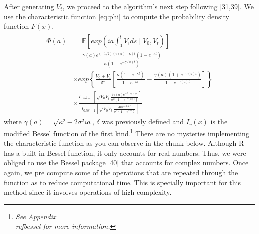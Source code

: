 \documentclass[12pt,oneside]{reedthesis}
\theoremstyle{definition}
\theoremstyle{definition}
\theoremstyle{remark}
\begin{document}
  After generating \(V_t\), we proceed to the algorithm's next step
  following {[}31,39{]}. We use the characteristic function \eqref{eq:phi}
  to compute the probability density function \(F(x)\).
  \begin{align} \label{eq:phi}
  \begin{split}
  \Phi(a) &= \mathbb{E}\left[ exp \left( ia \int_{0}^{t}{V_s ds} \mid V_0,V_t \right)  \right] \\[10pt]
  &= \frac{\gamma(a)e^{(-1/2)(\gamma(a)- \kappa) t} (1 - e^{- \kappa t})}{\kappa (1 - e^{- \gamma(a) t})} \\[10pt]
  &\times exp \left\{\frac{V_0 + V_t}{\sigma^2} \left[ \frac{\kappa (1 + e^{- \kappa t})}{1 - e^{- \kappa t}} - \frac{\gamma(a) (1 + e^{- \gamma(a) t})}{1 - e^{- \gamma(a) t}} \right] \right\} \\[10pt]
  &\times \frac{I_{0.5\delta - 1} \left[ \sqrt{V_0 V_t} \frac{4 \gamma(a) e^{-0.5 \gamma(a) t}}{\sigma^2 (1 - e^{- \gamma(a) t})} \right]}{I_{0.5\delta - 1}  \left[ \sqrt{V_0 V_t} \frac{4 \kappa e^{-0.5 \kappa t}}{\sigma^2 (1 - e^{- \kappa t})} \right]}
  \end{split}
  \end{align}
  where \(\gamma(a) = \sqrt{\kappa^2 - 2 \sigma^2 i a}\), \(\delta\) was
  previously defined and \(I_v(x)\) is the modified Bessel function of the
  first kind.\footnote{\textit{See Appendix  \\ref{bessel} for more information.}}
  There are no mysteries implementing the characteristic function as you
  can observe in the chunk below. Although R has a built-in Bessel
  function, it only accounts for real numbers. Thus, we were obliged to
  use the Bessel package {[}40{]} that accounts for complex numbers. Once
  again, we pre compute some of the operations that are repeated through
  the function as to reduce computational time. This is specially
  important for this method since it involves operations of high
  complexity.
  
\end{document}
